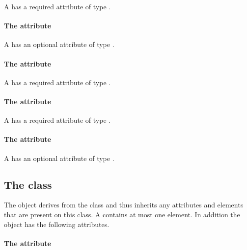 A \RenderCubicBezier has a required attribute  of
type \RelAbsVector.

\paragraph{The \fixttspace{} attribute}

A \RenderCubicBezier has an optional attribute  of
type \RelAbsVector.

\paragraph{The \fixttspace{} attribute}

A \RenderCubicBezier has a required attribute  of
type \RelAbsVector.

\paragraph{The \fixttspace{} attribute}

A \RenderCubicBezier has a required attribute  of
type \RelAbsVector.

\paragraph{The \fixttspace{} attribute}

A \RenderCubicBezier has an optional attribute  of
type \RelAbsVector.

\subsection{The  class}
\label{rendercurve-class}


The \RenderCurve object derives from the 
class and thus inherits any attributes and elements that are present on
this class.
A \RenderCurve contains at most one  element.
In addition the \RenderCurve object has the following attributes.

\paragraph{The \fixttspace{} attribute}

